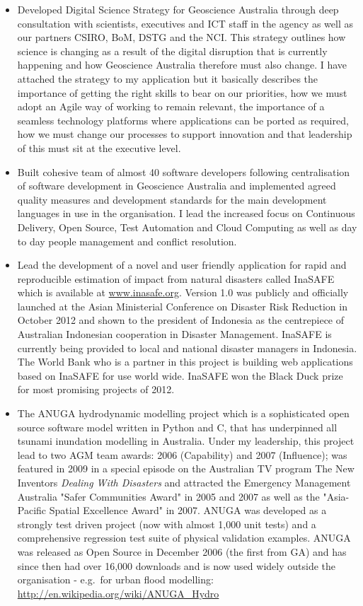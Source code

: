 \documentclass[11pt,a4paper]{article}
\begin{document}
\begin{itemize}
\item Developed Digital Science Strategy for Geoscience Australia through deep consultation with scientists, executives and ICT staff in the agency as well as our partners CSIRO, BoM, DSTG and the NCI. This strategy outlines how science is changing as a result of the digital disruption that is currently happening and how Geoscience Australia therefore must also change. I have attached the strategy to my application but it basically describes the importance of getting the right skills to bear on our priorities, how we must adopt an Agile way of working to remain relevant, the importance of a seamless technology platforms where applications can be ported as required, how we must change our processes to support innovation and that leadership of this must sit at the executive level.  
  \item Built cohesive team of almost 40 software developers following centralisation of software development in Geoscience Australia and implemented agreed quality measures and development standards for the main development languages in use in the organisation. I lead the increased focus on Continuous Delivery, Open Source, Test Automation and Cloud Computing as well as day to day people management and conflict resolution.
  \item Lead the development of a novel and user friendly application for rapid and reproducible estimation of impact from natural disasters called InaSAFE which is available at \url{www.inasafe.org}.
  Version 1.0 was publicly and officially launched at the Asian Ministerial Conference on Disaster Risk Reduction in October 2012 and shown to the president of Indonesia as the centrepiece of Australian Indonesian cooperation in Disaster Management. InaSAFE is currently being provided to local and national disaster managers in Indonesia. The World Bank who is a partner in this project is building web applications based on InaSAFE for use world wide.
  InaSAFE won the Black Duck prize for most promising projects of 2012. %
  \item The ANUGA hydrodynamic modelling project which is a sophisticated open source software model written in Python and C, that has underpinned all tsunami inundation modelling in Australia. Under my leadership, this project lead to two AGM team awards: 2006 (Capability) and 2007 (Influence); was featured in 2009 in a special episode on the Australian TV program The New Inventors \emph{Dealing With Disasters} and attracted the Emergency Management Australia "Safer Communities Award" in 2005 and 2007 as well as the "Asia-Pacific Spatial Excellence Award" in 2007. ANUGA was developed as a strongly test driven project (now with almost 1,000 unit tests) and a comprehensive regression test suite of physical validation examples. ANUGA was released as Open Source in December 2006 (the first from GA) and has since then had over 16,000 downloads and is now used widely outside the organisation - e.g.\ for urban flood modelling: \url{http://en.wikipedia.org/wiki/ANUGA_Hydro}

\end{itemize}
\end{document}
